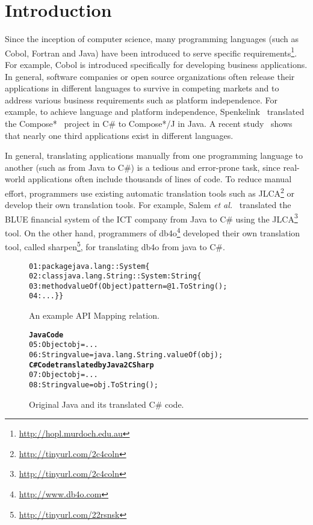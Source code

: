 \section{Introduction}
\label{sec:introduction}

Since the inception of computer science, many programming languages (such as Cobol, Fortran and Java) have been introduced to serve specific requirements\footnote{\url{http://hopl.murdoch.edu.au}}. For example, Cobol is introduced specifically for developing business applications. In general, software companies or open source organizations often release their applications in different languages to survive in competing markets and to address various business requirements such as platform independence. For example, to achieve language and platform independence, Spenkelink~\cite{spenkelink2007porting} translated the Compose*~\cite{garcia-compose} project in C\# to Compose*/J in Java. A recent study~\cite{jones1998estimating} shows that nearly one third applications exist in different languages. 

In general, translating applications manually from one programming language to another (such as from Java to C\#) is a tedious and error-prone task, since real-world applications often include thousands of lines of code. To reduce manual effort, programmers use existing automatic translation tools such as JLCA\footnote{\url{http://tinyurl.com/2c4coln}} or develop their own translation tools. For example, Salem \emph{et al.}~\cite{AgtashAEMBS06} translated the BLUE financial system of the ICT company from Java to C\# using the JLCA\footnote{\url{http://tinyurl.com/2c4coln}} tool. On the other hand, programmers of db4o\footnote{\url{http://www.db4o.com}} developed their own translation tool, called sharpen\footnote{\url{http://tinyurl.com/22rsnsk}}, for translating db4o from java to C\#. 

\begin{figure}[t]
\begin{CodeOut}%
\begin{alltt}
01: package java.lang::System\{
02:   class java.lang.String :: System:String\{
03:   method valueOf(Object) { pattern = @1.ToString(); }
04:   ...\}\}
\end{alltt}
\end{CodeOut}\vspace*{-4ex}
\caption{\label{fig:mapping} An example API Mapping relation.}\vspace*{-2ex}
\begin{CodeOut}%
\begin{alltt}
\textbf{Java Code}
05:  Object obj = ...
06:  String value = java.lang.String.valueOf(obj);
\textbf{C# Code translated by Java2CSharp}
07:  Object obj = ...
08:  String value = obj.ToString();
\end{alltt}
\end{CodeOut}\vspace*{-4ex}
\caption{\label{fig:transcode}Original Java and its translated C\# code.}\vspace*{-4ex}
\end{figure}

